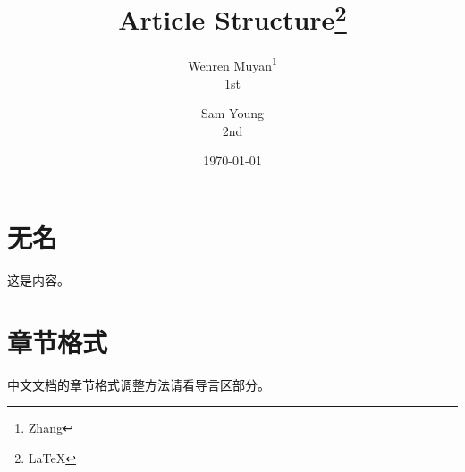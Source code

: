 \documentclass{ctexart}
\title{Article Structure\thanks{LaTeX}}
\author{Wenren Muyan\thanks{Zhang}\\1st  \and Sam Young\\2nd}
\date{\today}
\begin{document}
    \maketitle
    \tableofcontents

    \section{无名}
        这是内容。

    \section{章节格式}
        中文文档的章节格式调整方法请看导言区部分。
        
\end{document}
